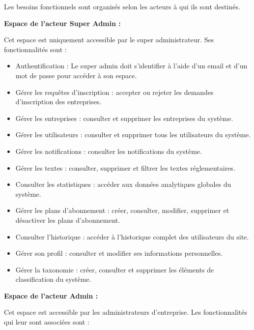 \noindent Les besoins fonctionnels sont organisés selon les acteurs à qui ils sont destinés.

\noindent\textbf{Espace de l'acteur Super Admin :}

\noindent Cet espace est uniquement accessible par le super administrateur. Ses fonctionnalités sont :

\begin{itemize}
  \item Authentification : Le super admin doit s'identifier à l'aide d'un email et d'un mot de passe pour accéder à son espace.
  \item Gérer les requêtes d'inscription : accepter ou rejeter les demandes d'inscription des entreprises.
  \item Gérer les entreprises : consulter et supprimer les entreprises du système.
  \item Gérer les utilisateurs : consulter et supprimer tous les utilisateurs du système.
  \item Gérer les notifications : consulter les notifications du système.
  \item Gérer les textes : consulter, supprimer et filtrer les textes réglementaires.
  \item Consulter les statistiques : accéder aux données analytiques globales du système.
  \item Gérer les plans d'abonnement : créer, consulter, modifier, supprimer et désactiver les plans d'abonnement.
  \item Consulter l'historique : accéder à l'historique complet des utilisateurs du site.
  \item Gérer son profil : consulter et modifier ses informations personnelles.
  \item Gérer la taxonomie : créer, consulter et supprimer les éléments de classification du système.
\end{itemize}

\noindent\textbf{Espace de l'acteur Admin :}

\noindent Cet espace est accessible par les administrateurs d'entreprise. Les fonctionnalités qui leur sont associées sont :

